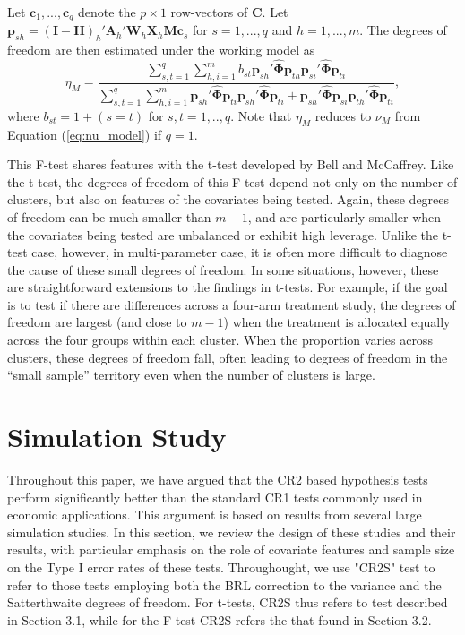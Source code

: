 \documentclass[12pt]{article}\usepackage[]{graphicx}\usepackage[]{color}
\newcommand{\bm}{\mathbf}
\newcommand{\bs}{\boldsymbol}
\begin{document}
Let $\bm{c}_1,...,\bm{c}_q$ denote the $p \times 1$ row-vectors of $\bm{C}$. 
Let $\bm{p}_{sh} = \left(\bm{I} - \bm{H}\right)_h'\bm{A}_h'\bm{W}_h\bm{X}_h\bm{M}\bm{c}_s$ for $s = 1,...,q$ and $h = 1,...,m$. 
The degrees of freedom are then estimated under the working model as
\begin{equation}
\label{eq:eta_model}
\eta_M = \frac{\sum_{s,t=1}^q \sum_{h,i=1}^m b_{st} \bm{p}_{sh}'\hat{\bs\Phi}\bm{p}_{th} \bm{p}_{si}'\hat{\bs\Phi}\bm{p}_{ti}}{\sum_{s,t=1}^q \sum_{h,i=1}^m \bm{p}_{sh}'\hat{\bs\Phi}\bm{p}_{ti} \bm{p}_{sh}'\hat{\bs\Phi}\bm{p}_{ti} + \bm{p}_{sh}'\hat{\bs\Phi}\bm{p}_{si} \bm{p}_{th}'\hat{\bs\Phi}\bm{p}_{ti}},
\end{equation}
where $b_{st} = 1 + (s=t)$ for $s,t=1,..,q$.
Note that $\eta_M$ reduces to $\nu_M$ from Equation (\ref{eq:nu_model}) if $q = 1$.

This F-test shares features with the t-test developed by Bell and McCaffrey. Like the t-test, the degrees of freedom of this F-test depend not only on the number of clusters, but also on features of the covariates being tested. 
Again, these degrees of freedom can be much smaller than $m - 1$, and are particularly smaller when the covariates being tested are unbalanced or exhibit high leverage. 
Unlike the t-test case, however, in multi-parameter case, it is often more difficult to diagnose the cause of these small degrees of freedom. 
In some situations, however, these are straightforward extensions to the findings in t-tests. 
For example, if the goal is to test if there are differences across a four-arm treatment study, the degrees of freedom are largest (and close to $m - 1$) when the treatment is allocated equally across the four groups within each cluster. 
When the proportion varies across clusters, these degrees of freedom fall, often leading to degrees of freedom in the ``small sample'' territory even when the number of clusters is large. 

\section{Simulation Study}
\label{sec:simulation}

Throughout this paper, we have argued that the CR2 based hypothesis tests perform significantly better than the standard CR1 tests commonly used in economic applications. 
This argument is based on results from several large simulation studies. 
In this section, we review the design of these studies and their results, with particular emphasis on the role of covariate features and sample size on the Type I error rates of these tests.
Throughought, we use "CR2S" test to refer to those tests employing both the BRL correction to the variance and the Satterthwaite degrees of freedom. 
For t-tests, CR2S thus refers to test described in Section 3.1, while for the F-test CR2S refers the that found in Section 3.2. 
\end{document}
